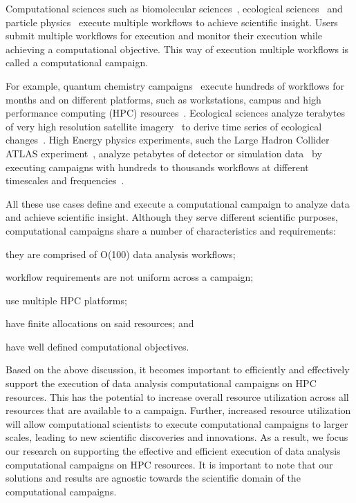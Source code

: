 
Computational sciences such as biomolecular sciences~\cite{cheatham2015impact,
dakka2018concurrent}, ecological sciences~\cite{goncalves2020sealnet,
paraskevakos2019workflow} and particle physics~\cite{atlas} execute multiple
workflows to achieve scientific insight. Users submit multiple workflows for
execution and monitor their execution while achieving a computational objective.
This way of execution multiple workflows is called a computational campaign.

For example, quantum chemistry campaigns~\cite{smith2020molssi} execute hundreds
of workflows for months and on different platforms, such as workstations, campus
and high performance computing (HPC) resources~\cite{smith2020molssi}.
Ecological sciences analyze terabytes of very high resolution satellite
imagery~\cite{goncalves2020sealnet} to derive time series of ecological
changes~\cite{paraskevakos2019workflow}. High Energy physics experiments, such
the Large Hadron Collider ATLAS experiment~\cite{atlas}, analyze petabytes of
detector or simulation data~\cite{borodin2015big} by executing campaigns with
hundreds to thousands workflows at different timescales and
frequencies~\cite{borodin2015big}.

All these use cases define and execute a computational campaign to analyze data
and achieve scientific insight. Although they serve different scientific
purposes, computational campaigns share a number of characteristics and
requirements:
\begin{inparaenum}[(1)]
    \item they are comprised of O(100) data analysis workflows;
    \item workflow requirements are not uniform across a campaign;
    \item use multiple HPC platforms;
    \item have finite allocations on said resources; and
    \item have well defined computational objectives.
\end{inparaenum}

Based on the above discussion, it becomes important to efficiently and
effectively support the execution of data analysis computational campaigns on 
HPC resources. This has the potential to increase overall resource utilization
across all resources that are available to a campaign. Further, increased
resource utilization will allow computational scientists to execute
computational campaigns to larger scales, leading to new scientific discoveries
and innovations. As a result, we focus our research on supporting the effective
and efficient execution of data analysis computational campaigns on HPC 
resources. It is important to note that our solutions and results are agnostic 
towards the scientific domain of the computational campaigns.

